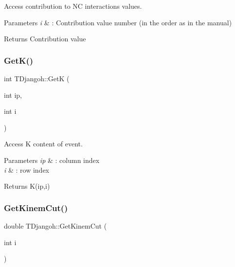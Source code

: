 Access contribution to NC interactions values. 


\begin{DoxyParams}{Parameters}
{\em i} & \+: Contribution value number (in the order as in the manual) \\
\hline
\end{DoxyParams}
\begin{DoxyReturn}{Returns}
Contribution value 
\end{DoxyReturn}
\mbox{\label{class_t_djangoh_aaf2c94dbb8382bbd3b7ed1530a8ac878}} 
\subsubsection{\texorpdfstring{Get\+K()}{GetK()}}
{\footnotesize\ttfamily int T\+Djangoh\+::\+GetK (\begin{DoxyParamCaption}\item[{int}]{ip,  }\item[{int}]{i }\end{DoxyParamCaption})\hspace{0.3cm}{\ttfamily [inline]}}



Access K content of event. 


\begin{DoxyParams}{Parameters}
{\em ip} & \+: column index \\
\hline
{\em i} & \+: row index \\
\hline
\end{DoxyParams}
\begin{DoxyReturn}{Returns}
K(ip,i) 
\end{DoxyReturn}
\mbox{\label{class_t_djangoh_a6baf26c760e0fc2f7bfc802fe7b14093}} 
\subsubsection{\texorpdfstring{Get\+Kinem\+Cut()}{GetKinemCut()}}
{\footnotesize\ttfamily double T\+Djangoh\+::\+Get\+Kinem\+Cut (\begin{DoxyParamCaption}\item[{int}]{i }\end{DoxyParamCaption})}



